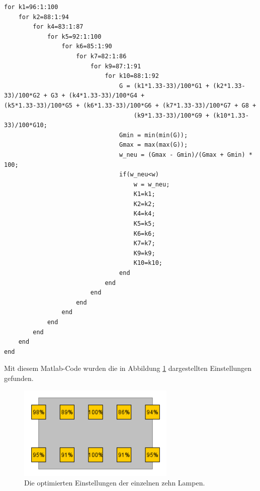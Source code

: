 \documentclass[a4paper,bibtotoc,oneside]{scrbook}
\begin{document}
\begin{verbatim}
for k1=96:1:100
    for k2=88:1:94
        for k4=83:1:87
            for k5=92:1:100
                for k6=85:1:90
                    for k7=82:1:86
                        for k9=87:1:91
                            for k10=88:1:92
                                G = (k1*1.33-33)/100*G1 + (k2*1.33-33)/100*G2 + G3 + (k4*1.33-33)/100*G4 + 		                                    (k5*1.33-33)/100*G5 + (k6*1.33-33)/100*G6 + (k7*1.33-33)/100*G7 + G8 +  
                                    (k9*1.33-33)/100*G9 + (k10*1.33-33)/100*G10;
                                Gmin = min(min(G));
                                Gmax = max(max(G));
                                w_neu = (Gmax - Gmin)/(Gmax + Gmin) * 100;
                                if(w_neu<w)
                                    w = w_neu;
                                    K1=k1;
                                    K2=k2;
                                    K4=k4;
                                    K5=k5;
                                    K6=k6;
                                    K7=k7;
                                    K9=k9;
                                    K10=k10;                                  
                                end
                            end
                        end
                    end
                end
            end
        end
    end
end
\end{verbatim}

\noindent Mit diesem Matlab-Code wurden die in Abbildung \ref{opt} dargestellten Einstellungen gefunden.

\begin{figure}[htbp]
\centering
\includegraphics[width=75mm]{img/std.png}
\caption{Die optimierten Einstellungen der einzelnen zehn Lampen.}\label{opt}
\end{figure}
\end{document}
